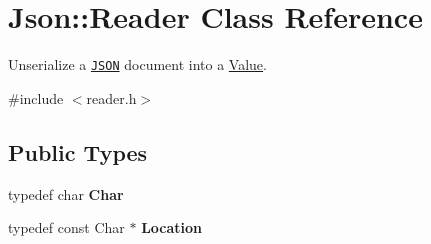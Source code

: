 \hypertarget{class_json_1_1_reader}{\section{Json\+:\+:Reader Class Reference}
\label{class_json_1_1_reader}
}


Unserialize a \href{http://www.json.org}{\tt J\+S\+O\+N} document into a \hyperlink{class_json_1_1_value}{Value}.  




{\ttfamily \#include $<$reader.\+h$>$}

\subsection*{Public Types}
\begin{DoxyCompactItemize}
\item 
\hypertarget{class_json_1_1_reader_a3eec9118f3e9a672ba8348c3a79d0f45}{typedef char {\bfseries Char}}\label{class_json_1_1_reader_a3eec9118f3e9a672ba8348c3a79d0f45}

\item 
\hypertarget{class_json_1_1_reader_a46795b5b272bf79a7730e406cb96375a}{typedef const Char $\ast$ {\bfseries Location}}\label{class_json_1_1_reader_a46795b5b272bf79a7730e406cb96375a}

\end{DoxyCompactItemize}
